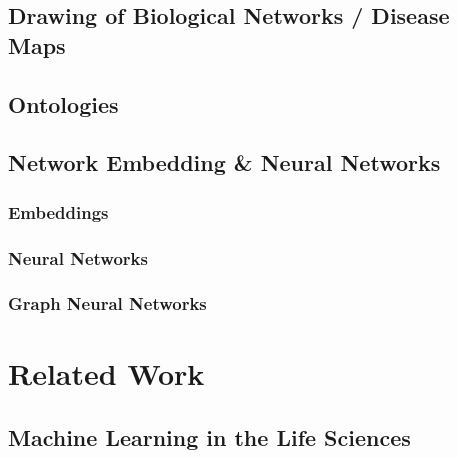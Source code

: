\documentclass[
	fontsize=10pt, %
	twoside=false, %
	secnumdepth=1, %
]{kaobook}
\begin{document}




\section{Drawing of Biological Networks / Disease Maps}
\label{sec:draw-biol-netw}


\section{Ontologies}
\label{sec:ontologies}

\section{Network Embedding \& Neural Networks}
\label{sec:neural-networks}

\subsection{Embeddings}

\subsection{Neural Networks}

\subsection{Graph Neural Networks}



\chapter{Related Work}
\label{sec:related-work}
\blindtext

\section{Machine Learning in the Life Sciences}
\label{sec:ml-in-ls}
\end{document}
